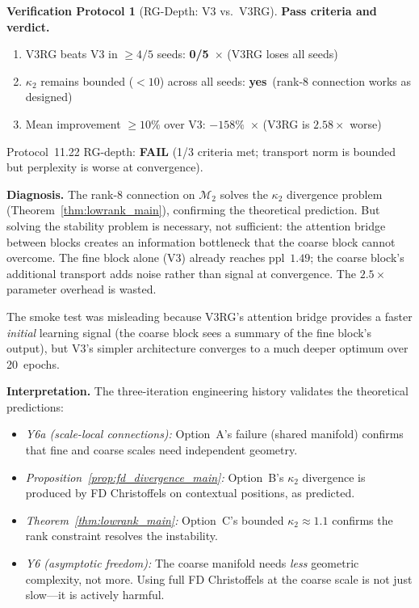 \documentclass[11pt,a4paper]{article}
\theoremstyle{definition}
\newtheorem{protocol}[theorem]{Verification Protocol}
\theoremstyle{remark}
\begin{document}
\begin{protocol}[RG-Depth: V3 vs.\ V3RG]
\medskip
\textbf{Pass criteria and verdict.}
\begin{enumerate}[nosep]
  \item V3RG beats V3 in $\geq 4/5$ seeds: 
  \textbf{0/5}~$\times$ (V3RG loses all seeds)
  \item $\kappa_2$ remains bounded ($< 10$) across all seeds: 
  \textbf{yes}~\checkmark (rank-8 connection works as designed)
  \item Mean improvement $\geq 10\%$ over V3: 
  \textbf{$-158\%$}~$\times$ (V3RG is $2.58\times$ worse)
\end{enumerate}
Protocol~11.22 RG-depth: \textbf{FAIL} (1/3 criteria met; 
transport norm is bounded but perplexity is worse at convergence).

\medskip
\textbf{Diagnosis.} The rank-8 connection on $\mathcal{M}_2$ 
solves the $\kappa_2$ divergence problem 
(Theorem~\ref{thm:lowrank_main}), confirming the theoretical 
prediction. But solving the stability problem is necessary, not 
sufficient: the attention bridge between blocks creates an 
information bottleneck that the coarse block cannot overcome. The 
fine block alone (V3) already reaches ppl~$1.49$; the coarse 
block's additional transport adds noise rather than signal at 
convergence. The $2.5\times$ parameter overhead is wasted.

The smoke test was misleading because V3RG's attention bridge 
provides a faster \emph{initial} learning signal (the coarse block 
sees a summary of the fine block's output), but V3's simpler 
architecture converges to a much deeper optimum over 20~epochs.

\medskip
\textbf{Interpretation.} The three-iteration engineering history 
validates the theoretical predictions:
\begin{itemize}[nosep]
  \item \emph{Y6a (scale-local connections):} Option~A's failure 
  (shared manifold) confirms that fine and coarse scales need 
  independent geometry.
  \item \emph{Proposition~\ref{prop:fd_divergence_main}:} 
  Option~B's $\kappa_2$ divergence is produced by FD 
  Christoffels on contextual positions, as predicted.
  \item \emph{Theorem~\ref{thm:lowrank_main}:} Option~C's 
  bounded $\kappa_2 \approx 1.1$ confirms the rank constraint 
  resolves the instability.
  \item \emph{Y6 (asymptotic freedom):} The coarse manifold 
  needs \emph{less} geometric complexity, not more. Using full 
  FD Christoffels at the coarse scale is not just slow---it is 
  actively harmful.
\end{itemize}
\end{protocol}
\end{document}
